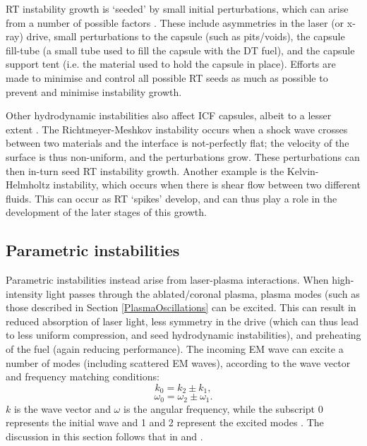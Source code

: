 RT instability growth is `seeded' by small initial perturbations, which can arise from a number of possible factors \cite{Haines2019a}. These include asymmetries in the laser (or x-ray) drive, small perturbations to the capsule (such as pits/voids), the capsule fill-tube (a small tube used to fill the capsule with the DT fuel), and the capsule support tent (i.e. the material used to hold the capsule in place). Efforts are made to minimise and control all possible RT seeds as much as possible to prevent and minimise instability growth.

Other hydrodynamic instabilities also affect ICF capsules, albeit to a lesser extent \cite{Atzeni2008}. The Richtmeyer-Meshkov instability occurs when a shock wave crosses between two materials and the interface is not-perfectly flat; the velocity of the surface is thus non-uniform, and the perturbations grow. These perturbations can then in-turn seed RT instability growth. Another example is the Kelvin-Helmholtz instability, which occurs when there is shear flow between two different fluids. This can occur as RT `spikes' develop, and can thus play a role in the development of the later stages of this growth.

\subsection{Parametric instabilities} \label{Parametric instabilities}
Parametric instabilities instead arise from laser-plasma interactions. When high-intensity light passes through the ablated/coronal plasma, plasma modes (such as those described in Section \ref{PlasmaOscillations} can be excited. This can result in reduced absorption of laser light, less symmetry in the drive (which can thus lead to less uniform compression, and seed hydrodynamic instabilities), and preheating of the fuel (again reducing performance). The incoming EM wave can excite a number of modes (including scattered EM waves), according to the wave vector and frequency matching conditions:
\begin{equation} k_0 = k_2 \pm k_1, \end{equation}
\begin{equation} \omega_0 = \omega_2 \pm \omega_1. \label{eqn: freq matching} \end{equation}
$k$ is the wave vector and $\omega$ is the angular frequency, while the subscript 0 represents the initial wave and 1 and 2 represent the excited modes \cite{Chen2016}. The discussion in this section follows that in \cite{Chen2016} and \cite{Craxton2015}.

